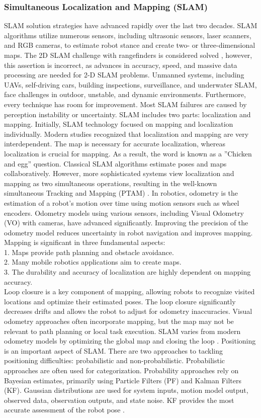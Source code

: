 \subsubsection{Simultaneous Localization and Mapping (SLAM)}
SLAM solution strategies have advanced rapidly over the last two decades. SLAM algorithms utilize numerous sensors, including ultrasonic sensors, laser scanners, and RGB cameras, to estimate robot stance and create two- or three-dimensional maps. The 2D SLAM challenge with rangefinders is considered solved \cite{li2016real}, however, this assertion is incorrect, as advances in accuracy, speed, and massive data processing are needed for 2-D SLAM problems. Unmanned systems, including UAVs, self-driving cars, building inspections, surveillance, and underwater SLAM, face challenges in outdoor, unstable, and dynamic environments. Furthermore, every technique has room for improvement. Most SLAM failures are caused by perception instability or uncertainty. SLAM includes two parts: localization and mapping. Initially, SLAM technology focused on mapping and localization individually. Modern studies recognized that localization and mapping are very interdependent. The map is necessary for accurate localization, whereas localization is crucial for mapping. As a result, the word is known as a ''Chicken and egg'' question. Classical SLAM algorithms estimate poses and maps collaboratively. However, more sophisticated systems view localization and mapping as two simultaneous operations, resulting in the well-known simultaneous Tracking and Mapping (PTAM) \cite{klein2007parallel,Taheri2021}. 
In robotics, odometry is the estimation of a robot's motion over time using motion sensors such as wheel encoders. Odometry models using various sensors, including Visual Odometry (VO) with cameras, have advanced significantly. Improving the precision of the odometry model reduces uncertainty in robot navigation and improves mapping. Mapping is significant in three fundamental aspects: \\
1. Maps provide path planning and obstacle avoidance. \\
2. Many mobile robotics applications aim to create maps.\\
3. The durability and accuracy of localization are highly dependent on mapping accuracy.\\
Loop closure is a key component of mapping, allowing robots to recognize visited locations and optimize their estimated poses. The loop closure significantly decreases drifts and allows the robot to adjust for odometry inaccuracies. Visual odometry approaches often incorporate mapping, but the map may not be relevant to path planning or local task execution. SLAM varies from modern odometry models by optimizing the global map and closing the loop \cite{cadena2016past}. Positioning is an important aspect of SLAM. There are two approaches to tackling positioning difficulties: probabilistic and non-probabilistic. Probabilistic approaches are often used for categorization. Probability approaches rely on Bayesian estimates, primarily using Particle Filters (PF) and Kalman Filters (KF). Gaussian distributions are used for system inputs, motion model output, observed data, observation outputs, and state noise. KF provides the most accurate assessment of the robot pose \cite{yavuz2009simultaneous}.

